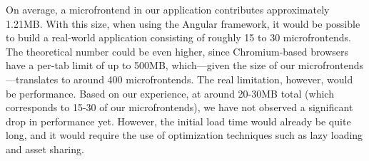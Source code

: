 On average, a microfrontend in our application contributes approximately 1.21MB. With this size, when using the Angular framework, it would be possible to build a real-world application consisting of roughly 15 to 30 microfrontends. The theoretical number could be even higher, since Chromium-based browsers have a per-tab limit of up to 500MB, which—given the size of our microfrontends—translates to around 400 microfrontends. The real limitation, however, would be performance. Based on our experience, at around 20-30MB total (which corresponds to 15-30 of our microfrontends), we have not observed a significant drop in performance yet. However, the initial load time would already be quite long, and it would require the use of optimization techniques such as lazy loading and asset sharing.